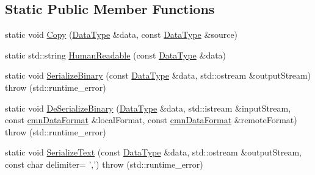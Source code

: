 \subsection*{Static Public Member Functions}
\begin{DoxyCompactItemize}
\item 
static void \hyperlink{classcmn_data_3_01vct_fixed_size_matrix_3_01__element_type_00_01__rows_00_01__cols_00_01__row_major_01_4_01_4_a33f6aa12c25b4ba0be14f6ae06567f13}{Copy} (\hyperlink{classcmn_data_3_01vct_fixed_size_matrix_3_01__element_type_00_01__rows_00_01__cols_00_01__row_major_01_4_01_4_a6b06110fd1bb7049b72ce21275dd8aee}{Data\-Type} \&data, const \hyperlink{classcmn_data_3_01vct_fixed_size_matrix_3_01__element_type_00_01__rows_00_01__cols_00_01__row_major_01_4_01_4_a6b06110fd1bb7049b72ce21275dd8aee}{Data\-Type} \&source)
\item 
static std\-::string \hyperlink{classcmn_data_3_01vct_fixed_size_matrix_3_01__element_type_00_01__rows_00_01__cols_00_01__row_major_01_4_01_4_a48634a092c1b2434183bb2ee90f3e845}{Human\-Readable} (const \hyperlink{classcmn_data_3_01vct_fixed_size_matrix_3_01__element_type_00_01__rows_00_01__cols_00_01__row_major_01_4_01_4_a6b06110fd1bb7049b72ce21275dd8aee}{Data\-Type} \&data)
\item 
static void \hyperlink{classcmn_data_3_01vct_fixed_size_matrix_3_01__element_type_00_01__rows_00_01__cols_00_01__row_major_01_4_01_4_a1d823ba1a8c10099cbd46bdbff1ad013}{Serialize\-Binary} (const \hyperlink{classcmn_data_3_01vct_fixed_size_matrix_3_01__element_type_00_01__rows_00_01__cols_00_01__row_major_01_4_01_4_a6b06110fd1bb7049b72ce21275dd8aee}{Data\-Type} \&data, std\-::ostream \&output\-Stream)  throw (std\-::runtime\-\_\-error)
\item 
static void \hyperlink{classcmn_data_3_01vct_fixed_size_matrix_3_01__element_type_00_01__rows_00_01__cols_00_01__row_major_01_4_01_4_a0f24993fe2d0776eae9957029c22ed6e}{De\-Serialize\-Binary} (\hyperlink{classcmn_data_3_01vct_fixed_size_matrix_3_01__element_type_00_01__rows_00_01__cols_00_01__row_major_01_4_01_4_a6b06110fd1bb7049b72ce21275dd8aee}{Data\-Type} \&data, std\-::istream \&input\-Stream, const \hyperlink{classcmn_data_format}{cmn\-Data\-Format} \&local\-Format, const \hyperlink{classcmn_data_format}{cmn\-Data\-Format} \&remote\-Format)  throw (std\-::runtime\-\_\-error)
\item 
static void \hyperlink{classcmn_data_3_01vct_fixed_size_matrix_3_01__element_type_00_01__rows_00_01__cols_00_01__row_major_01_4_01_4_a32663c3d502d7d103f1b0d17564b13e0}{Serialize\-Text} (const \hyperlink{classcmn_data_3_01vct_fixed_size_matrix_3_01__element_type_00_01__rows_00_01__cols_00_01__row_major_01_4_01_4_a6b06110fd1bb7049b72ce21275dd8aee}{Data\-Type} \&data, std\-::ostream \&output\-Stream, const char delimiter= ',')  throw (std\-::runtime\-\_\-error)

\end{DoxyCompactItemize}
